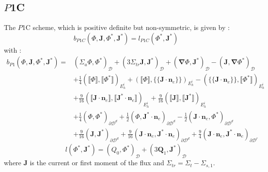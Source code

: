\documentclass[preprint,10pt]{elsarticle}
\newcommand\bn{\boldsymbol{\nabla}}
\newcommand\bs{\boldsymbol}
\newcommand\ldb{\{\!\!\{}
\newcommand\rdb{\}\!\!\}}
\newcommand\llb{\llbracket}
\newcommand\rrb{\rrbracket}
\renewcommand{\(}{\left(}
\renewcommand{\)}{\right)}
\renewcommand{\[}{\left[}
\renewcommand{\]}{\right]}
\begin{document}
\begin{appendices}
\subsection{$P$1C}
The $P$1C scheme, which is positive definite but non-symmetric, is given by :
\begin{equation}
b_{P1C}(\Phi,\bs{J},\Phi^*,\bs{J}^*) = l_{P1C}(\Phi^*,\bs{J}^*)
\end{equation}
with :
\begin{equation}
\begin{split}
b_{P1}(\Phi,\bs{J},\Phi^*,\bs{J}^*) = & (\Sigma_a \Phi,\Phi^*)_{\mathcal{D}} +
(3\Sigma_{tr} \bs{J},\bs{J}^*)_{\mathcal{D}} + (\bn
\Phi,\bs{J}^*)_{\mathcal{D}} - (\bs{J},\bn \Phi^*)_{\mathcal{D}}\\
&+\frac{1}{4} \(\llb\Phi\rrb,\llb\Phi^*\rrb\)_{E_h^i} +
\(\llb\Phi\rrb,\ldb\bs{J}\cdot\bs{n}_e\rdb\)_{E_h^i} - (\ldb
\bs{J}\cdot\bs{n}_e\rdb, \llb\Phi^*\rrb)_{E_h^i}\\
&+\frac{9}{16}\(\llb\bs{J}\cdot\bs{n}_e\rrb,\llb\bs{J}^*\cdot\bs{n}_e\rrb\)_{E_h^i}
+ \frac{9}{16}\(\llb\bs{J}\rrb,\llb\bs{J}^*\rrb\)_{E_h^i}\\
&+\frac{1}{4}(\Phi,\Phi^*)_{\partial \mathcal{D}^d} +
\frac{1}{2}(\Phi,\bs{J}^*\cdot\bs{n}_e)_{\partial \mathcal{D}^d} - \frac{1}{2}
(\bs{J}\cdot\bs{n}_e,\Phi^*)_{\partial\mathcal{D}^d}\\
&+\frac{9}{16}(\bs{J},\bs{J}^*)_{\partial
\mathcal{D}^d}+\frac{9}{16}(\bs{J}\cdot\bs{n}_e,\bs{J}^*\cdot\bs{n}_e)_{\partial 
\mathcal{D}^d} + \frac{9}{4} (\bs{J}\cdot\bs{n}_e,\bs{J}^*\cdot\bs{n}_e)_{\partial
\mathcal{D}^r}
\end{split}
\end{equation}
\begin{equation}
l(\Phi^*,\bs{J}^*) = (Q_0,\Phi^*)_{\mathcal{D}} +
(3\bs{Q}_1,\bs{J}^*)_{\mathcal{D}}
\end{equation}
where $\bs{J}$ is the current or first moment of the flux and 
$\Sigma_{tr}=\Sigma_t-\Sigma_{s,1}$.
\end{appendices}
\end{document}
